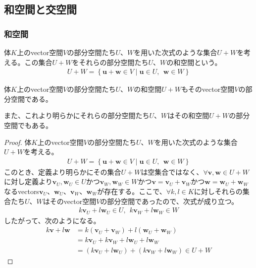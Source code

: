 \documentclass[dvipdfmx]{jsarticle}
\begin{document}
\subsection{和空間と交空間}%
\subsubsection{和空間}%
\begin{dfn}
体$K$上のvector空間$V$の部分空間たち$U$、$W$を用いた次式のような集合$U + W$を考える。この集合$U + W$をそれらの部分空間たち$U$、$W$の和空間という。
\begin{align*}
U + W = \left\{ \mathbf{u} + \mathbf{w} \in V \middle| \mathbf{u} \in U,\ \ \mathbf{w} \in W \right\}
\end{align*}
\end{dfn}
\begin{thm}\label{2.1.9.1}
体$K$上のvector空間$V$の部分空間たち$U$、$W$の和空間$U + W$もそのvector空間$V$の部分空間である。
\end{thm}\par
また、これより明らかにそれらの部分空間たち$U$、$W$はその和空間$U + W$の部分空間でもある。
\begin{proof}
体$K$上のvector空間$V$の部分空間たち$U$、$W$を用いた次式のような集合$U + W$を考える。
\begin{align*}
U + W = \left\{ \mathbf{u} + \mathbf{w} \in V \middle| \mathbf{u} \in U,\ \ \mathbf{w} \in W \right\}
\end{align*}
このとき、定義より明らかにその集合$U + W$は空集合ではなく、$\forall\mathbf{v},\mathbf{w} \in U + W$に対し定義より$\mathbf{v}_{U},\mathbf{w}_{U} \in U$かつ$\mathbf{v}_{W},\mathbf{w}_{W} \in W$かつ$\mathbf{v} = \mathbf{v}_{U} + \mathbf{v}_{W}$かつ$\mathbf{w} = \mathbf{w}_{U} + \mathbf{w}_{W}$なるvectors$\mathbf{v}_{U}$、$\mathbf{w}_{U}$、$\mathbf{v}_{W}$、$\mathbf{w}_{W}$が存在する。ここで、$\forall k,l \in K$に対しそれらの集合たち$U$、$W$はそのvector空間$V$の部分空間であったので、次式が成り立つ。
\begin{align*}
k\mathbf{v}_{U} + l\mathbf{w}_{U} \in U,\ \ k\mathbf{v}_{W} + l\mathbf{w}_{W} \in W
\end{align*}
したがって、次のようになる。
\begin{align*}
k\mathbf{v} + l\mathbf{w} &= k\left( \mathbf{v}_{U} + \mathbf{v}_{W} \right) + l\left( \mathbf{w}_{U} + \mathbf{w}_{W} \right)\\
&= k\mathbf{v}_{U} + k\mathbf{v}_{W} + l\mathbf{w}_{U} + l\mathbf{w}_{W}\\
&= \left( k\mathbf{v}_{U} + l\mathbf{w}_{U} \right) + \left( k\mathbf{v}_{W} + l\mathbf{w}_{W} \right) \in U + W
\end{align*}
\end{proof}
\end{document}

